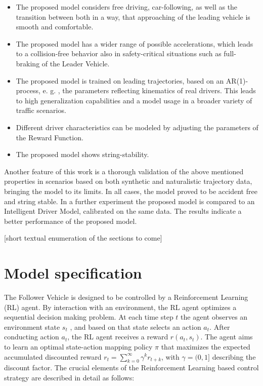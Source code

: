 \documentclass[review]{elsarticle}
\begin{document}
\begin{itemize}
	\item  The proposed model considers free driving, car-following, as well as the transition between both in a way, that approaching of the leading vehicle is smooth and comfortable.
	\item The proposed model has a wider range of possible accelerations, which leads to a collision-free behavior also in safety-critical situations such as full-braking of the Leader Vehicle.
	\item The proposed model is trained on leading trajectories, based on an AR(1)-process, e. g. \cite{HonerkampEngl}, the parameters reflecting kinematics of real drivers. This leads to high generalization capabilities and a model usage in a broader variety of traffic scenarios. 
	\item Different driver characteristics can be modeled by adjusting the parameters of the Reward Function.
	\item The proposed model shows string-stability.
	
\end{itemize}

Another feature of this work is a thorough validation of the above mentioned properties in scenarios based on both synthetic and naturalistic trajectory data, bringing the model to its limits. 
In all cases, the model proved to be accident free and string stable.
In a further experiment the proposed model is compared to an Intelligent Driver Model, calibrated on the same data. The results indicate a better performance of the proposed model.


[short textual enumeration of the sections to come]

\section{Model specification}
The Follower Vehicle is designed to be controlled by a Reinforcement Learning (RL) agent. By interaction with an environment, the RL agent optimizes a sequential decision making problem. At each time step $t$ the agent observes an environment state $s_t$ , and based on that state selects an action $a_t$. After conducting action $a_t$, the RL agent receives a reward $r(a_t,s_t)$. The agent aims to learn an optimal state-action mapping policy $\pi$ that maximizes the expected accumulated discounted reward $r_{t}=\sum_{k=0}^{\infty} \gamma^{k} r_{t+k}$, with $\gamma = (0,1]$ describing the discount factor. The crucial elements
of the Reinforcement Learning based control strategy are described
in detail as follows:
\end{document}

